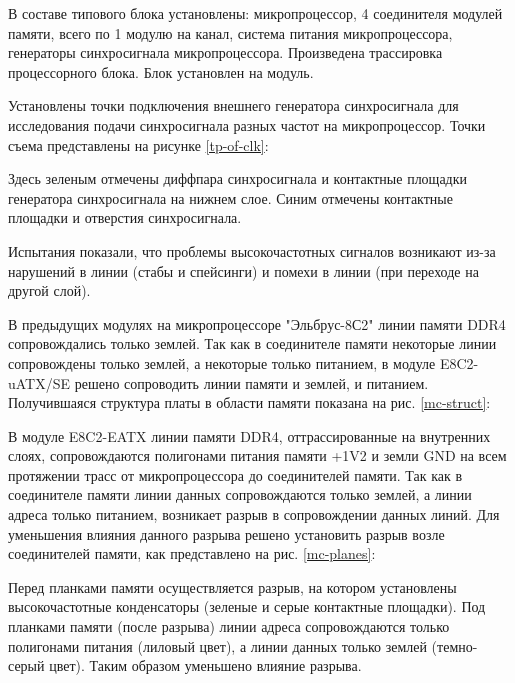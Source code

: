 В составе типового блока установлены: микропроцессор, 4 соединителя модулей памяти, всего по 1 модулю на канал, система питания микропроцессора, генераторы синхросигнала микропроцессора. Произведена трассировка процессорного блока. Блок установлен на модуль.


Установлены точки подключения внешнего генератора синхросигнала для исследования подачи синхросигнала разных частот на микропроцессор. Точки съема представлены на рисунке \ref{tp-of-clk}:


Здесь зеленым отмечены диффпара синхросигнала и контактные площадки генератора синхросигнала на нижнем слое. Синим отмечены контактные площадки и отверстия синхросигнала. 

Испытания показали, что проблемы высокочастотных сигналов возникают из-за нарушений в линии (стабы и спейсинги) и помехи в линии (при переходе на другой слой).
 
В предыдущих модулях на микропроцессоре "Эльбрус-8С2" линии памяти DDR4 сопровождались только землей. Так как в соединителе памяти некоторые линии сопровождены только землей, а некоторые только питанием, в модуле E8C2-uATX/SE решено сопроводить линии памяти и землей, и питанием. Получившаяся структура платы в области памяти показана на рис. \ref{mc-struct}:

В модуле E8C2-EATX линии памяти DDR4, оттрассированные на внутренних слоях, сопровождаются полигонами питания памяти +1V2 и земли GND на всем протяжении трасс от микропроцессора до соединителей памяти. Так как в соединителе памяти линии данных сопровождаются только землей, а линии адреса только питанием, возникает разрыв в сопровождении данных линий. Для уменьшения влияния данного разрыва решено установить разрыв возле соединителей памяти, как представлено на рис. \ref{mc-planes}:

Перед планками памяти осуществляется разрыв, на котором установлены высокочастотные конденсаторы (зеленые и серые контактные площадки). Под планками памяти (после разрыва) линии адреса сопровождаются только полигонами питания (лиловый цвет), а линии данных только землей (темно-серый цвет). Таким образом уменьшено влияние разрыва.

